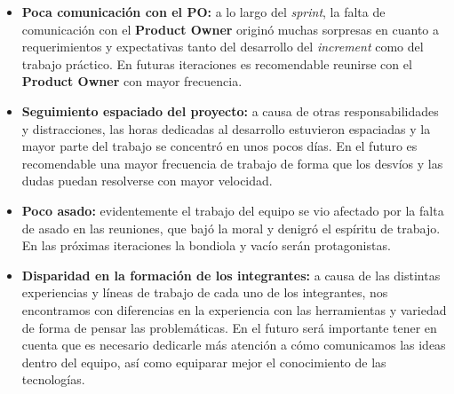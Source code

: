 \documentclass[10pt, a4paper]{article}
\begin{document}
\begin{itemize}
  \item \textbf{Poca comunicación con el PO:} a lo largo del \emph{sprint}, la falta de comunicación con el \textbf{Product Owner} originó muchas sorpresas en cuanto a requerimientos y expectativas tanto del desarrollo del \emph{increment} como del trabajo práctico. En futuras iteraciones es recomendable reunirse con el \textbf{Product Owner} con mayor frecuencia.
  \item \textbf{Seguimiento espaciado del proyecto:} a causa de otras responsabilidades y distracciones, las horas dedicadas al desarrollo estuvieron espaciadas y la mayor parte del trabajo se concentró en unos pocos días. En el futuro es recomendable una mayor frecuencia de trabajo de forma que los desvíos y las dudas puedan resolverse con mayor velocidad.
  \item \textbf{Poco asado:} evidentemente el trabajo del equipo se vio afectado por la falta de asado en las reuniones, que bajó la moral y denigró el espíritu de trabajo. En las próximas iteraciones la bondiola y vacío serán protagonistas.
  \item \textbf{Disparidad en la formación de los integrantes:} a causa de las distintas experiencias y líneas de trabajo de cada uno de los integrantes, nos encontramos con diferencias en la experiencia con las herramientas y variedad de forma de pensar las problemáticas. En el futuro será importante tener en cuenta que es necesario dedicarle más atención a cómo comunicamos las ideas dentro del equipo, así como equiparar mejor el conocimiento de las tecnologías.
\end{itemize}
\end{document}
